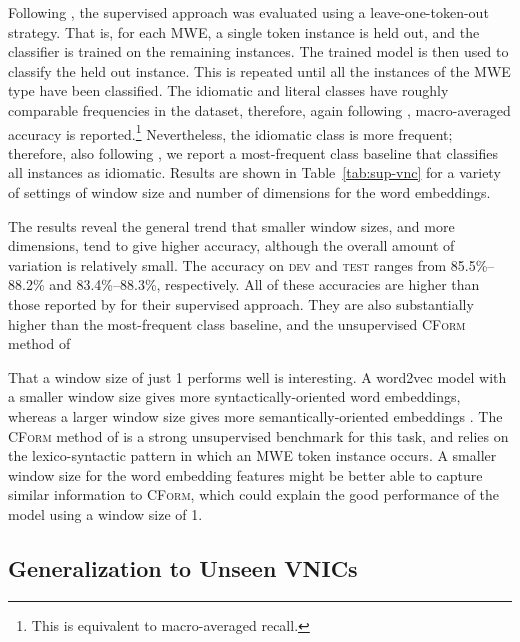 \documentclass[11pt]{article}
\newcommand{\tabref}[1]{Table~\ref{#1}}
\newcommand{\cform}{\textsc{CForm}\xspace}
\newcommand{\VNICs}{VNICs\xspace}
\newcommand{\dev}{\textsc{dev}\xspace}
\newcommand{\test}{\textsc{test}\xspace}
\begin{document}
Following \cite{Fazly2009}, the supervised approach was evaluated
using a leave-one-token-out strategy. That is, for each MWE, a single
token instance is held out, and the classifier is trained on the
remaining instances. The trained model is then used to classify the
held out instance. This is repeated until all the instances of the MWE
type have been classified. The idiomatic and literal classes have
roughly comparable frequencies in the dataset, therefore, again
following \citeauthor{Fazly2009}, macro-averaged accuracy is
reported.\footnote{This is equivalent to macro-averaged recall.}
Nevertheless, the idiomatic class is more frequent; therefore, also
following \citeauthor{Fazly2009}, we report a most-frequent class
baseline that classifies all instances as idiomatic.  Results are
shown in \tabref{tab:sup-vnc} for a variety of settings of window size
and number of dimensions for the word embeddings.



The results reveal the general trend that smaller window sizes, and
more dimensions, tend to give higher accuracy, although the overall
amount of variation is relatively small. The accuracy on \dev and
\test ranges from 85.5\%--88.2\% and 83.4\%--88.3\%, respectively. All
of these accuracies are higher than those reported by \cite{Fazly2009}
for their supervised approach. They are also substantially higher than
the most-frequent class baseline, and the unsupervised \cform method
of \citeauthor{Fazly2009}

That a window size of just 1 performs well is interesting. A word2vec
model with a smaller window size gives more syntactically-oriented
word embeddings, whereas a larger window size gives more
semantically-oriented embeddings \citep{trask2015modeling}.  The
\cform method of \cite{Fazly2009} is a strong unsupervised benchmark
for this task, and relies on the lexico-syntactic pattern in which an
MWE token instance occurs. A smaller window size for the word
embedding features might be better able to capture similar information
to \cform, which could explain the good performance of the model using
a window size of 1.

\subsection{Generalization to Unseen \VNICs}
\end{document}
